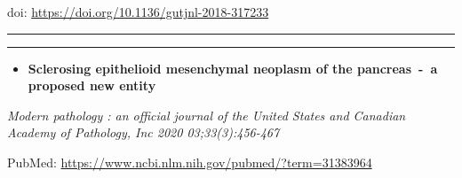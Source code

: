 \documentclass[
]{article}
\providecommand{\tightlist}{%
  \setlength{\itemsep}{0pt}\setlength{\parskip}{0pt}}
\begin{document}
doi: \url{https://doi.org/10.1136/gutjnl-2018-317233}

\begin{center}\rule{0.5\linewidth}{0.5pt}\end{center}

\begin{center}\rule{0.5\linewidth}{0.5pt}\end{center}

\begin{itemize}
\tightlist
\item
  \textbf{Sclerosing epithelioid mesenchymal neoplasm of the
  pancreas~-~a proposed new entity}
\end{itemize}

\emph{Modern pathology : an official journal of the United States and
Canadian Academy of Pathology, Inc 2020 03;33(3):456-467}

PubMed: \url{https://www.ncbi.nlm.nih.gov/pubmed/?term=31383964}
\end{document}
